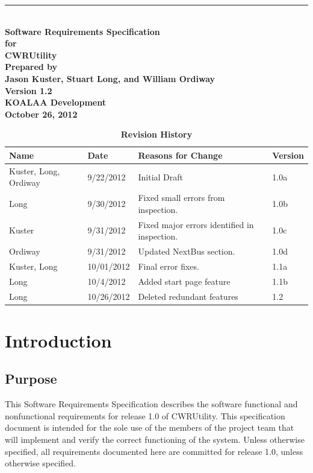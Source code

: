 \documentclass[pdftex,12pt,letter]{article}
\newcommand{\HRule}{\rule{\linewidth}{0.5mm}}
\begin{document}
\begin{titlepage}
\begin{flushright}
\HRule \\[0.4cm]
{ \bfseries
{\huge Software Requirements Specification\\[1cm]}
{\Large for\\[1cm]}
{\huge CWRUtility\large\\[4cm]}
{\large Prepared by\\Jason Kuster, Stuart Long, and William Ordiway\\[1cm]
Version 1.2\\[1cm]
KOALAA Development\\[1cm]
October 26, 2012}}
\end{flushright}
\end{titlepage}
\tableofcontents{}
\begin{table}[!t]
\caption*{\bfseries Revision History}
\begin{tabularx}{\textwidth }[t]{|l|Y|Y|l|}
\hline
\bfseries Name & \bfseries Date & \bfseries Reasons for Change & \bfseries Version \\ \hline
Kuster, Long, Ordiway & 9/22/2012 & Initial Draft & 1.0a\\
Long & 9/30/2012 & Fixed small errors from inspection. & 1.0b \\
Kuster & 9/31/2012 & Fixed major errors identified in inspection. & 1.0c \\
Ordiway & 9/31/2012 & Updated NextBus section. & 1.0d \\
Kuster, Long & 10/01/2012 & Final error fixes. & 1.1a \\
Long & 10/4/2012 & Added start page feature & 1.1b \\
Long & 10/26/2012 & Deleted redundant features & 1.2\\
\hline
\end{tabularx}
\end{table}
\FloatBarrier
\newpage
\clearpage
\section{Introduction}
\subsection{Purpose}
This Software Requirements Specification describes the software functional and nonfunctional requirements for release 1.0 of CWRUtility. This specification document is intended for the sole use of the members of the project team that will implement and verify the correct functioning of the system. Unless otherwise specified, all requirements documented here are committed for release 1.0, unless otherwise specified.
\end{document}

